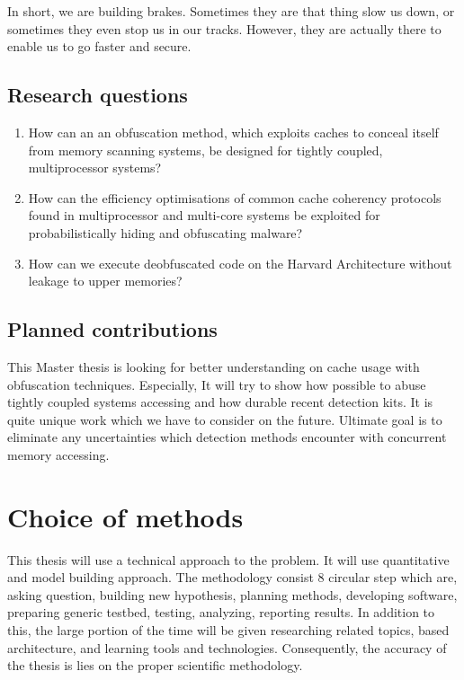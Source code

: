 In short, we are building brakes. Sometimes they are that thing slow us down, or sometimes they even stop us in our tracks. However, they are actually there to enable us to go faster and secure.

\subsection{Research questions}\label{research:questions}

\begin{enumerate}
	\item How can an an obfuscation method, which exploits caches to conceal itself from memory scanning systems, be designed for tightly coupled, multiprocessor systems?
	\item How can the efficiency optimisations of common cache coherency protocols found in multiprocessor and multi-core systems be exploited for probabilistically hiding and obfuscating malware?
	\item How can we execute deobfuscated code on the Harvard Architecture without leakage to upper memories?
\end{enumerate}


\subsection{Planned contributions}
This Master thesis is looking for better understanding on cache usage with obfuscation techniques. Especially, It will try to show how possible to abuse tightly coupled systems accessing and how durable recent detection kits. It is quite unique work which we have to consider on the future. Ultimate goal is to eliminate any uncertainties which detection methods encounter with concurrent memory accessing.

\section{Choice of methods}
	This thesis will use a technical approach to the problem. It will use quantitative and model building approach. The methodology consist 8 circular step which are, asking question, building new hypothesis, planning methods, developing software, preparing generic testbed, testing, analyzing, reporting results. In addition to this, the large portion of the time will be given researching related topics, based architecture, and learning tools and technologies. Consequently, the accuracy of the thesis is lies on the proper scientific methodology.

